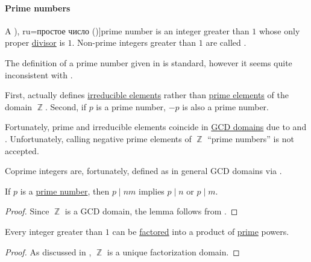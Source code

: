 \paragraph{Prime numbers}

\begin{definition}\label{def:prime_number}
  A \term[bg=просто число (\cite[10]{ДочевДимитровЧуканов1976}), ru=простое число (\cite[62]{Кострикин2004Том1})]{prime number} is an integer greater than \( 1 \) whose only proper \hyperref[def:divisibility]{divisor} is \( 1 \). Non-prime integers greater than \( 1 \) are called .
\end{definition}

\begin{remark}\label{rem:prime_numbers}
  The definition of a prime number given in  is standard, however it seems quite inconsistent with .

  First,  actually defines \hyperref[def:domain_divisibility/irreducible]{irreducible elements} rather than \hyperref[def:domain_divisibility/prime]{prime elements} of the domain \( \BbbZ \). Second, if \( p \) is a prime number, \( -p \) is also a prime number.

  Fortunately, prime and irreducible elements coincide in \hyperref[def:gcd_domain]{GCD domains} due to  and . Unfortunately, calling negative prime elements of \( \BbbZ \) \enquote{prime numbers} is not accepted.

  Coprime integers are, fortunately, defined as in general GCD domains via .
\end{remark}

\begin{lemma}\label{thm:euclids_lemma}
  If \( p \) is a \hyperref[def:prime_number]{prime number}, then \( p \mid nm \) implies \( p \mid n \) or \( p \mid m \).
\end{lemma}
\begin{proof}
  Since \( \BbbZ \) is a GCD domain, the lemma follows from .
\end{proof}

\begin{theorem}\label{thm:fundamental_theorem_of_arithmetic}
  Every integer greater than \( 1 \) can be \hyperref[def:irreducible_factorization]{factored} into a product of \hyperref[def:prime_number]{prime} powers.
\end{theorem}
\begin{proof}
  As discussed in , \( \BbbZ \) is a unique factorization domain.
\end{proof}

